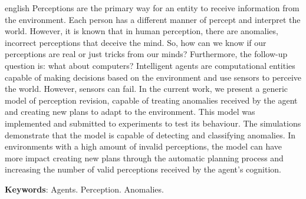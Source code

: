 \begin{resumo}[Abstract]
	\SingleSpacing
	\begin{otherlanguage*}{english}
		Perceptions are the primary way for an entity to receive information from the environment. Each person has a different manner of percept and interpret the world. However, it is known that in human perception, there are anomalies, incorrect perceptions that deceive the mind. So, how can we know if our perceptions are real or just tricks from our minds? Furthermore, the follow-up question is: what about computers? Intelligent agents are computational entities capable of making decisions based on the environment and use sensors to perceive the world. However, sensors can fail. In the current work, we present a generic model of perception revision, capable of treating anomalies received by the agent and creating new plans to adapt to the environment. This model was implemented and submitted to experiments to test its behaviour. The simulations demonstrate that the model is capable of detecting and classifying anomalies. In environments with a high amount of invalid perceptions, the model can have more impact creating new plans through the automatic planning process and increasing the number of valid perceptions received by the agent's cognition.
		
		\textbf{Keywords}: Agents. Perception. Anomalies.
	\end{otherlanguage*}
\end{resumo}
% 
%
%  

{%
	\hypersetup{hidelinks}
	\listoffigures*
	\cleardoublepage
	
	\listofquadros*
	\cleardoublepage
	
	\listoftables*
	\cleardoublepage
	
	
	
	
	
	
	\tableofcontents*
	\cleardoublepage
	
}%
